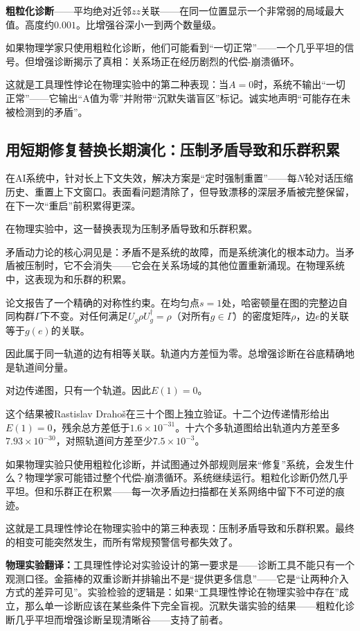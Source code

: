 \documentclass[11pt,a4paper]{book}
\theoremstyle{definition}
\begin{document}
\textbf{粗粒化诊断}——平均绝对近邻$zz$关联——在同一位置显示一个非常弱的局域最大值。高度约$0.001$。比增强谷深小一到两个数量级。

如果物理学家只使用粗粒化诊断，他们可能看到“一切正常”——一个几乎平坦的信号。但增强诊断揭示了真相：关系场正在经历剧烈的代偿-崩溃循环。

这就是工具理性悖论在物理实验中的第二种表现：当$A=0$时，系统不输出“一切正常”——它输出“A值为零”并附带“沉默失谐盲区”标记。诚实地声明“可能存在未被检测到的矛盾”。

\subsection{用短期修复替换长期演化：压制矛盾导致和乐群积累}

在AI系统中，针对长上下文失效，解决方案是“定时强制重置”——每$N$轮对话压缩历史、重置上下文窗口。表面看问题清除了，但导致漂移的深层矛盾被完整保留，在下一次“重启”前积累得更深。

在物理实验中，这一替换表现为压制矛盾导致和乐群积累。

矛盾动力论的核心洞见是：矛盾不是系统的故障，而是系统演化的根本动力。当矛盾被压制时，它不会消失——它会在关系场域的其他位置重新涌现。在物理系统中，这表现为和乐群的积累。

论文报告了一个精确的对称性约束。在均匀点$s=1$处，哈密顿量在图的完整边自同构群$\Gamma$下不变。对任何满足$U_g \rho U_g^\dagger = \rho$（对所有$g\in\Gamma$）的密度矩阵$\rho$，边$e$的关联等于$g(e)$的关联。

因此属于同一轨道的边有相等关联。轨道内方差恒为零。总增强诊断在谷底精确地是轨道间分量。

对边传递图，只有一个轨道。因此$E(1)=0$。

这个结果被Rastislav Drahoš在三十个图上独立验证。十二个边传递情形给出$E(1)=0$，残余总方差低于$1.6\times10^{-31}$。十六个多轨道图给出轨道内方差至多$7.93\times10^{-30}$，对照轨道间方差至少$7.5\times10^{-3}$。

如果物理实验只使用粗粒化诊断，并试图通过外部规则层来“修复”系统，会发生什么？物理学家可能错过整个代偿-崩溃循环。系统继续运行。粗粒化诊断仍然几乎平坦。但和乐群正在积累——每一次矛盾边扫描都在关系网络中留下不可逆的痕迹。

这就是工具理性悖论在物理实验中的第三种表现：压制矛盾导致和乐群积累。最终的相变可能突然发生，而所有常规预警信号都失效了。

\textbf{物理实验翻译：}工具理性悖论对实验设计的第一要求是——诊断工具不能只有一个观测口径。金箍棒的双重诊断并排输出不是“提供更多信息”——它是“让两种介入方式的差异可见”。实验检验的逻辑是：如果“工具理性悖论在物理实验中存在”成立，那么单一诊断应该在某些条件下完全盲视。沉默失谐实验的结果——粗粒化诊断几乎平坦而增强诊断呈现清晰谷——支持了前者。
\end{document}
